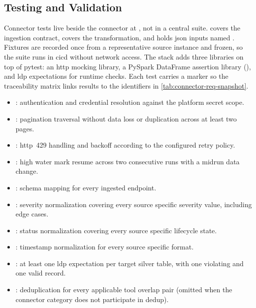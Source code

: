 
\subsection{Testing and Validation}
\label{sec:connector-testing}

Connector tests live beside the connector at , not in a central suite.  covers the ingestion contract,  covers the transformation, and  holds \gls{json} inputs named . Fixtures are recorded once from a representative source instance and frozen, so the suite runs in \gls{cicd} without network access. The stack adds three libraries on top of pytest: an \gls{http} mocking library, a PySpark DataFrame assertion library (), and \gls{ldp} expectations for runtime checks. Each test carries a  marker so the traceability matrix links results to the identifiers in \autoref{tab:connector-req-snapshot}.

\begin{itemize}
    \item {}: authentication and credential resolution against the platform secret scope.
    \item {}: pagination traversal without data loss or duplication across at least two pages.
    \item {}: \gls{http}~429 handling and backoff according to the configured retry policy.
    \item {}: high water mark resume across two consecutive runs with a midrun data change.
    \item {}: schema mapping for every ingested endpoint.
    \item {}: severity normalization covering every source specific severity value, including edge cases.
    \item {}: status normalization covering every source specific lifecycle state.
    \item {}: timestamp normalization for every source specific format.
    \item {}: at least one \gls{ldp} expectation per target silver table, with one violating and one valid record.
    \item {}: deduplication for every applicable tool overlap pair (omitted when the connector category does not participate in dedup).
\end{itemize}

